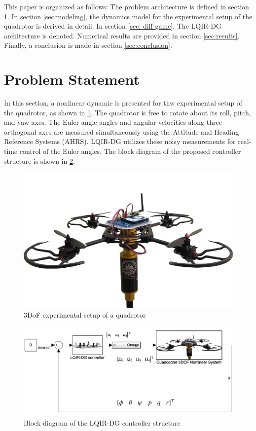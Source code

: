 \documentclass[conference]{IEEEtran}
\begin{document}
     This paper is organized as follows: The problem architecture is defined in section \ref{sec:problem_statement}. In section \ref{sec:modeling}, the dynamics model for the experimental setup of the quadrotor is derived in detail. In section \ref{sec: diff game}, The LQIR-DG architecture is denoted. Numerical results are provided in section \ref{sec:results}. Finally, a conclusion is made in section \ref{sec:conclusion}.
\section{Problem Statement}\label{sec:problem_statement}
\noindent In this section, a nonlinear dynamic is presented for thw experimental setup of the quadrotor, as shown in \figurename{\ref{quadlab}}.
The quadrotor is free to rotate about its roll, pitch, and yaw axes. The Euler angle angles and angular velocities along three orthogonal axes are measured simultaneously using the Attitude and Heading Reference Systems (AHRS). LQIR-DG utilizes these noisy measurements for real-time control of the Euler angles. The block diagram of the proposed controller structure is shown in \figurename{\ref{block_diagram}}.
\begin{figure}[!h]
	\vspace{0.1cm}
	\includegraphics[width=\linewidth]{../Figures/introduction/3DOFQuad.png}
	\centering
	\caption{3DoF experimental setup of a quadrotor}
	\label{quadlab}
\end{figure}
\begin{figure}[!h]
	\includegraphics[width=.9\linewidth]{../Figures/introduction/block_diagram2.png}
	\centering
	\caption{Block diagram of the LQIR-DG controller structure}
	\label{block_diagram}
\end{figure}
\end{document}
